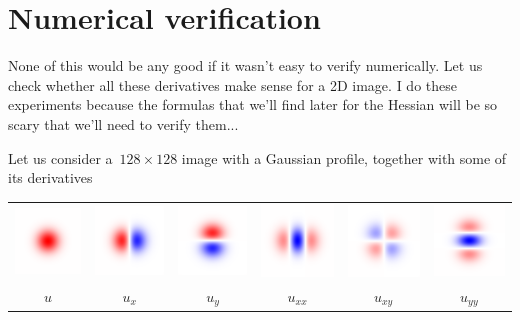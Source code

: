 \clearpage
\section{Numerical verification}

None of this would be any good if it wasn't easy to verify numerically.  Let
us check whether all these derivatives make sense for a 2D image.  I do these
experiments because the formulas that we'll find later for the Hessian will
be so scary that we'll need to verify them...

Let us consider a~$128\times128$ image with a Gaussian profile, together with
some of its derivatives


\begin{tabular}{cccccc}
\includegraphics{fgauss.png} &
\includegraphics{fgaussx.png} &
\includegraphics{fgaussy.png} &
\includegraphics{fgaussxx.png} &
\includegraphics{fgaussxy.png} &
\includegraphics{fgaussyy.png} \\
$u$ & $u_x$ & $u_y$ & $u_{xx}$ & $u_{xy}$ & $u_{yy}$
\end{tabular}
